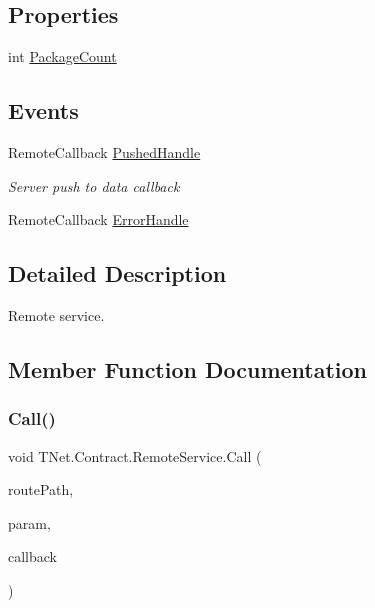 \subsection*{Properties}
\begin{DoxyCompactItemize}
\item 
int \mbox{\hyperlink{class_t_net_1_1_contract_1_1_remote_service_afba9a8932721f36073ea0dc197316a2f}{Package\+Count}}
\end{DoxyCompactItemize}
\subsection*{Events}
\begin{DoxyCompactItemize}
\item 
Remote\+Callback \mbox{\hyperlink{class_t_net_1_1_contract_1_1_remote_service_a359541f7a12b4829d9b5f0689326d9b8}{Pushed\+Handle}}
\begin{DoxyCompactList}\small\item\em Server push to data callback \end{DoxyCompactList}\item 
Remote\+Callback \mbox{\hyperlink{class_t_net_1_1_contract_1_1_remote_service_ad910d4f7a265817237aa7be64b0ad11d}{Error\+Handle}}
\end{DoxyCompactItemize}


\subsection{Detailed Description}
Remote service. 



\subsection{Member Function Documentation}
\mbox{\label{class_t_net_1_1_contract_1_1_remote_service_a32caa60c2d1d3110516eeb82022b7137}} 
\subsubsection{\texorpdfstring{Call()}{Call()}}
{\footnotesize\ttfamily void T\+Net.\+Contract.\+Remote\+Service.\+Call (\begin{DoxyParamCaption}\item[{string}]{route\+Path,  }\item[{Request\+Param}]{param,  }\item[{Action$<$ \mbox{\hyperlink{class_t_net_1_1_contract_1_1_remote_package}{Remote\+Package}} $>$}]{callback }\end{DoxyParamCaption})}






